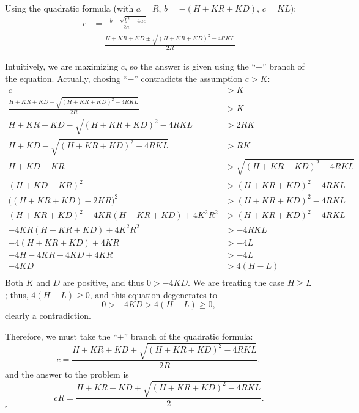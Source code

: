 \documentclass{article}
\begin{document}
Using the quadratic formula (with $a = R$, $b = -(H+KR+KD)$, $c = KL$):
\begin{align*}
    c &= \frac{-b \pm \sqrt{b^2 - 4ac}}{2a} \\
      &= \frac{H + KR + KD \pm \sqrt{(H+KR+KD)^2 - 4RKL}}{2R}
\end{align*}

Intuitively, we are maximizing $c$,
so the answer is given using the ``$+$'' branch of the equation.
Actually, chosing ``$-$'' contradicts the assumption $c > K$:
\begin{align*}
    c &> K \\
    \frac{H + KR + KD - \sqrt{(H+KR+KD)^2 - 4RKL}}{2R} &> K \\
    H + KR + KD - \sqrt{(H+KR+KD)^2 - 4RKL} &> 2RK \\
    H + KD - \sqrt{(H+KR+KD)^2 - 4RKL} &> RK \\
    H + KD - KR &> \sqrt{(H+KR+KD)^2 - 4RKL} \\
    (H + KD - KR)^2 &> (H+KR+KD)^2 - 4RKL \\
    \Big((H + KR + KD) - 2KR\Big)^2 &> (H+KR+KD)^2 - 4RKL \\
    (H + KR + KD)^2 - 4KR(H + KR + KD) + 4K^2R^2 &> (H+KR+KD)^2 - 4RKL \\
    -4KR(H + KR + KD) + 4K^2R^2 &> - 4RKL \\
    -4(H + KR + KD) + 4KR &> - 4L \\
    -4H -4KR -4KD + 4KR &> - 4L \\
    -4KD &> 4(H-L) \\
\end{align*}
Both $K$ and $D$ are positive, and thus $0 > -4KD$.
We are treating the case $H \geq L$;
thus, $4(H-L) \geq 0$,
and this equation degenerates to
\begin{equation*}
    0 > -4KD > 4(H-L) \geq 0,
\end{equation*}
clearly a contradiction.

Therefore, we must take the ``$+$'' branch of the quadratic formula:
\begin{equation*}
    c = \frac{H + KR + KD + \sqrt{(H+KR+KD)^2 - 4RKL}}{2R},
\end{equation*}
and the answer to the problem is
\begin{equation*}
    cR = \frac{H + KR + KD + \sqrt{(H+KR+KD)^2 - 4RKL}}{2}.
\end{equation*}
\hfill $\square$
\end{document}
